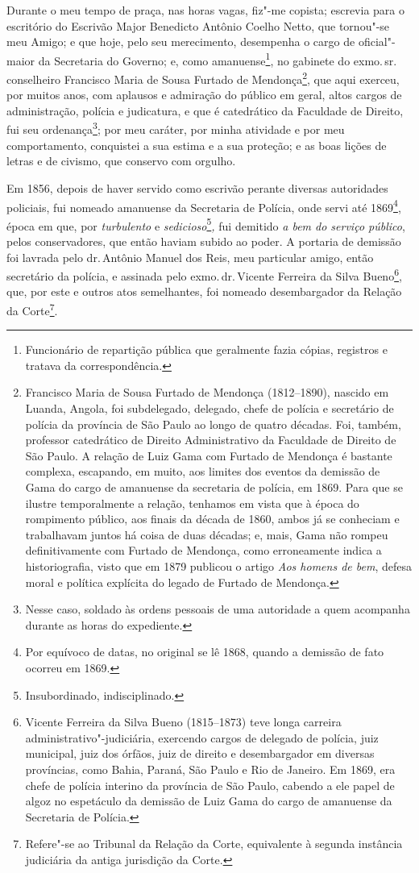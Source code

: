 Durante o meu tempo de praça, nas horas vagas, fiz"-me copista; escrevia
para o escritório do Escrivão Major Benedicto Antônio Coelho Netto, que
tornou"-se meu Amigo; e que hoje, pelo seu merecimento, desempenha o
cargo de oficial"-maior da Secretaria do Governo; e, como
amanuense\footnote{Funcionário de repartição pública que geralmente
  fazia cópias, registros e tratava da correspondência.}, no gabinete do
exmo.\,sr.\,conselheiro Francisco Maria de Sousa Furtado de
Mendonça\footnote{Francisco Maria de Sousa Furtado de Mendonça \label{fmfm}
  (1812--1890), nascido em Luanda, Angola, foi subdelegado, delegado,
  chefe de polícia e secretário de polícia da província de São Paulo ao
  longo de quatro décadas. Foi, também, professor catedrático de Direito
  Administrativo da Faculdade de Direito de São Paulo. A relação de Luiz
  Gama com Furtado de Mendonça é bastante complexa, escapando, em muito,
  aos limites dos eventos da demissão de Gama do cargo de amanuense da
  secretaria de polícia, em 1869. Para que se ilustre temporalmente a
  relação, tenhamos em vista que à época do rompimento público, aos
  finais da década de 1860, ambos já se conheciam e trabalhavam juntos
  há coisa de duas décadas; e, mais, Gama não rompeu definitivamente com
  Furtado de Mendonça, como erroneamente indica a historiografia, visto
  que em 1879 publicou o artigo \emph{Aos homens de bem}, defesa moral e
  política explícita do legado de Furtado de Mendonça.}, que aqui
exerceu, por muitos anos, com aplausos e admiração do público em geral,
altos cargos de administração, polícia e judicatura, e que é catedrático
da Faculdade de Direito, fui seu ordenança\footnote{Nesse caso,
  soldado às ordens pessoais de uma autoridade a quem acompanha durante
  as horas do expediente.}; por meu caráter, por minha atividade e por
meu comportamento, conquistei a sua estima e a sua proteção; e as boas
lições de letras e de civismo, que conservo com orgulho.

Em 1856, depois de haver servido como escrivão perante diversas
autoridades policiais, fui nomeado amanuense da Secretaria de Polícia,
onde servi até 1869\footnote{Por equívoco de datas, no original se lê
  1868, quando a demissão de fato ocorreu em 1869.}, época em que, por
\emph{turbulento} e \emph{sedicioso}\footnote{Insubordinado,
  indisciplinado.}\emph{,} fui demitido \emph{a bem do serviço público},
pelos conservadores, que então haviam subido ao poder. A portaria de
demissão foi lavrada pelo dr.\,Antônio Manuel dos Reis, meu particular
amigo, então secretário da polícia, e assinada pelo exmo.\,dr.\,Vicente
Ferreira da Silva Bueno\footnote{Vicente Ferreira da Silva Bueno \label{bueno}
  (1815--1873) teve longa carreira administrativo"-judiciária, exercendo
  cargos de delegado de polícia, juiz municipal, juiz dos órfãos, juiz
  de direito e desembargador em diversas províncias, como Bahia, Paraná,
  São Paulo e Rio de Janeiro. Em 1869, era chefe de polícia interino da
  província de São Paulo, cabendo a ele papel de algoz no espetáculo da
  demissão de Luiz Gama do cargo de amanuense da Secretaria de Polícia.},
que, por este e outros atos semelhantes, foi nomeado desembargador da
Relação da Corte\footnote{Refere"-se ao Tribunal da Relação da Corte,
  equivalente à segunda instância judiciária da antiga jurisdição da
  Corte.}.

